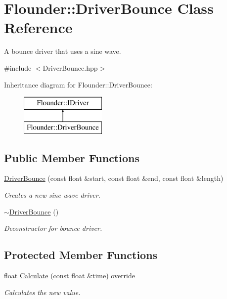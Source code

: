 \hypertarget{class_flounder_1_1_driver_bounce}{}\section{Flounder\+:\+:Driver\+Bounce Class Reference}
\label{class_flounder_1_1_driver_bounce}


A bounce driver that uses a sine wave.  




{\ttfamily \#include $<$Driver\+Bounce.\+hpp$>$}

Inheritance diagram for Flounder\+:\+:Driver\+Bounce\+:\begin{figure}[H]
\begin{center}
\leavevmode
\includegraphics[height=2.000000cm]{class_flounder_1_1_driver_bounce}
\end{center}
\end{figure}
\subsection*{Public Member Functions}
\begin{DoxyCompactItemize}
\item 
\hyperlink{class_flounder_1_1_driver_bounce_a41ee701fe3125026a5012e098497ea23}{Driver\+Bounce} (const float \&start, const float \&end, const float \&length)
\begin{DoxyCompactList}\small\item\em Creates a new sine wave driver. \end{DoxyCompactList}\item 
\hyperlink{class_flounder_1_1_driver_bounce_a4cad978a22ce31c18fff37bced7a7c0a}{$\sim$\+Driver\+Bounce} ()
\begin{DoxyCompactList}\small\item\em Deconstructor for bounce driver. \end{DoxyCompactList}\end{DoxyCompactItemize}
\subsection*{Protected Member Functions}
\begin{DoxyCompactItemize}
\item 
float \hyperlink{class_flounder_1_1_driver_bounce_adaa9ef8c5e0b4cdab93c453258c001dd}{Calculate} (const float \&time) override
\begin{DoxyCompactList}\small\item\em Calculates the new value. \end{DoxyCompactList}\end{DoxyCompactItemize}
